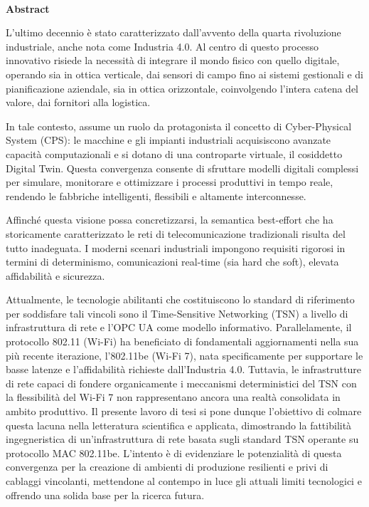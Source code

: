 \documentclass[12pt,a4paper,twoside]{book}
\begin{document}
\restoregeometry


\newpage

\topmargin=6.5cm

\newpage~\newpage
{}
\vspace*{-8cm} 

\begin{center}
    {\Huge\bfseries Abstract\par}
\end{center}

\enlargethispage{3\baselineskip}
\vspace*{2cm} 
\begingroup
\itshape

L'ultimo decennio è stato caratterizzato dall'avvento della quarta rivoluzione industriale, anche nota come Industria 4.0. Al centro di questo processo innovativo risiede la necessità di integrare il mondo fisico con quello digitale, operando sia in ottica verticale, dai sensori di campo fino ai sistemi gestionali e di pianificazione aziendale, sia in ottica orizzontale, coinvolgendo l'intera catena del valore, dai fornitori alla logistica. 

In tale contesto, assume un ruolo da protagonista il concetto di Cyber-Physical System (CPS): le macchine e gli impianti industriali acquisiscono avanzate capacità computazionali e si dotano di una controparte virtuale, il cosiddetto Digital Twin. Questa convergenza consente di sfruttare modelli digitali complessi per simulare, monitorare e ottimizzare i processi produttivi in tempo reale, rendendo le fabbriche intelligenti, flessibili e altamente interconnesse.

Affinché questa visione possa concretizzarsi, la semantica best-effort che ha storicamente caratterizzato le reti di telecomunicazione tradizionali risulta del tutto inadeguata. I moderni scenari industriali impongono requisiti rigorosi in termini di determinismo, comunicazioni real-time (sia hard che soft), elevata affidabilità e sicurezza. 

Attualmente, le tecnologie abilitanti che costituiscono lo standard di riferimento per soddisfare tali vincoli sono il Time-Sensitive Networking (TSN) a livello di infrastruttura di rete e l'OPC UA come modello informativo. Parallelamente, il protocollo 802.11 (Wi-Fi) ha beneficiato di fondamentali aggiornamenti nella sua più recente iterazione, l'802.11be (Wi-Fi 7), nata specificamente per supportare le basse latenze e l'affidabilità richieste dall'Industria 4.0. Tuttavia, le infrastrutture di rete capaci di fondere organicamente i meccanismi deterministici del TSN con la flessibilità del Wi-Fi 7 non rappresentano ancora una realtà consolidata in ambito produttivo. Il presente lavoro di tesi si pone dunque l'obiettivo di colmare questa lacuna nella letteratura scientifica e applicata, dimostrando la fattibilità ingegneristica di un'infrastruttura di rete basata sugli standard TSN operante su protocollo MAC 802.11be. L'intento è di evidenziare le potenzialità di questa convergenza per la creazione di ambienti di produzione resilienti e privi di cablaggi vincolanti, mettendone al contempo in luce gli attuali limiti tecnologici e offrendo una solida base per la ricerca futura.
\end{document}
